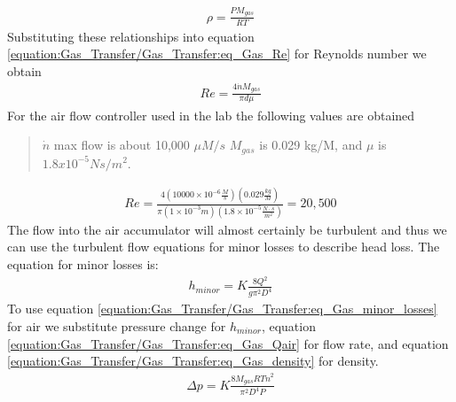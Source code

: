 \documentclass[letterpaper,10pt,english]{sphinxmanual}
\begin{document}
\begin{equation}\label{equation:Gas_Transfer/Gas_Transfer:eq_Gas_density}
\begin{split}\rho =\frac{PM_{gas} }{RT}\end{split}
\end{equation}
Substituting these relationships into equation \eqref{equation:Gas_Transfer/Gas_Transfer:eq_Gas_Re} for Reynolds number we obtain
\begin{equation}\label{equation:Gas_Transfer/Gas_Transfer:Gas_Transfer/Gas_Transfer:10}
\begin{split}{Re}=\frac{4\dot{n}M_{gas} }{\pi d\mu }\end{split}
\end{equation}
For the air flow controller used in the lab the following values are obtained
\begin{quote}

\(\dot{n}\) max flow is about 10,000 \(\mu M/s\) \(M_{gas}\) is 0.029 kg/M, and \(\mu\) is \(1.8 x 10^{-5} Ns/m^2\).
\end{quote}
\begin{equation}\label{equation:Gas_Transfer/Gas_Transfer:Gas_Transfer/Gas_Transfer:11}
\begin{split}{Re}=\frac{4\left(10000\times 10^{-6} \frac{M}{s} \right)\left(0.029\frac{kg}{M} \right)}{\pi \left(1\times 10^{-3} m\right)\left(1.8\times 10^{-5} \frac{N\cdot s}{m^{2} } \right)} =20,500\end{split}
\end{equation}
The flow into the air accumulator will almost certainly be turbulent and thus we can use the turbulent flow equations for minor losses to describe head loss. The equation for minor losses is:
\begin{equation}\label{equation:Gas_Transfer/Gas_Transfer:eq_Gas_minor_losses}
\begin{split}h_{minor} =K\frac{8Q^{2} }{g\pi ^{2} D^{4} }\end{split}
\end{equation}
To use equation \eqref{equation:Gas_Transfer/Gas_Transfer:eq_Gas_minor_losses} for air we substitute pressure change for \(h_{minor}\), equation \eqref{equation:Gas_Transfer/Gas_Transfer:eq_Gas_Qair} for flow rate, and equation \eqref{equation:Gas_Transfer/Gas_Transfer:eq_Gas_density} for density.
\begin{equation}\label{equation:Gas_Transfer/Gas_Transfer:eq_Gas_minor_losses_for_gas}
\begin{split}\Delta p=K\frac{8M_{gas} RT\dot{n}^{2} }{\pi ^{2} D^{4} P}\end{split}
\end{equation}
\end{document}
